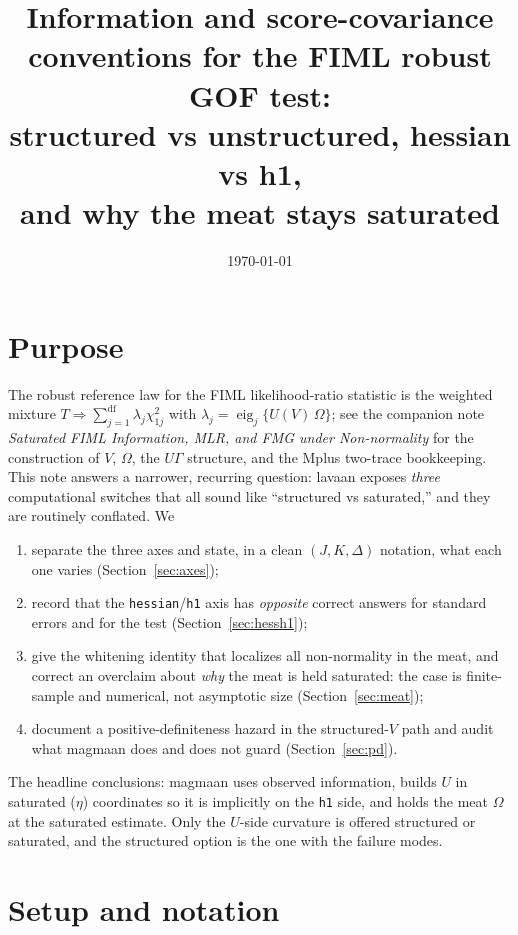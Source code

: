 \documentclass[11pt]{article}
\title{Information and score-covariance conventions for the FIML robust GOF
test:\\ structured vs unstructured, hessian vs h1,\\ and why the meat stays
saturated}
\author{}
\date{\today}
\newcommand{\eig}{\operatorname{eig}}
\theoremstyle{plain}
\theoremstyle{remark}
\begin{document}
\maketitle

\section*{Purpose}

The robust reference law for the FIML likelihood-ratio statistic is the
weighted mixture \(T \Rightarrow \sum_{j=1}^{\mathrm{df}}\lambda_j\chi^2_{1j}\)
with \(\lambda_j=\eig_j\{U(V)\,\Omega\}\); see the companion note
\emph{Saturated FIML Information, MLR, and FMG under Non-normality} for the
construction of \(V\), \(\Omega\), the \(U\Gamma\) structure, and the Mplus
two-trace bookkeeping. This note answers a narrower, recurring question: lavaan
exposes \emph{three} computational switches that all sound like ``structured vs
saturated,'' and they are routinely conflated. We

\begin{enumerate}
\item separate the three axes and state, in a clean \((J,K,\Delta)\) notation,
what each one varies (Section~\ref{sec:axes});
\item record that the \texttt{hessian}/\texttt{h1} axis has \emph{opposite}
correct answers for standard errors and for the test (Section~\ref{sec:hessh1});
\item give the whitening identity that localizes all non-normality in the meat,
and correct an overclaim about \emph{why} the meat is held saturated: the case
is finite-sample and numerical, not asymptotic size (Section~\ref{sec:meat});
\item document a positive-definiteness hazard in the structured-\(V\) path and
audit what magmaan does and does not guard (Section~\ref{sec:pd}).
\end{enumerate}

The headline conclusions: magmaan uses observed information, builds \(U\) in
saturated (\(\eta\)) coordinates so it is implicitly on the \texttt{h1} side,
and holds the meat \(\Omega\) at the saturated estimate. Only the \(U\)-side
curvature is offered structured or saturated, and the structured option is the
one with the failure modes.

\section*{Setup and notation}
\end{document}

